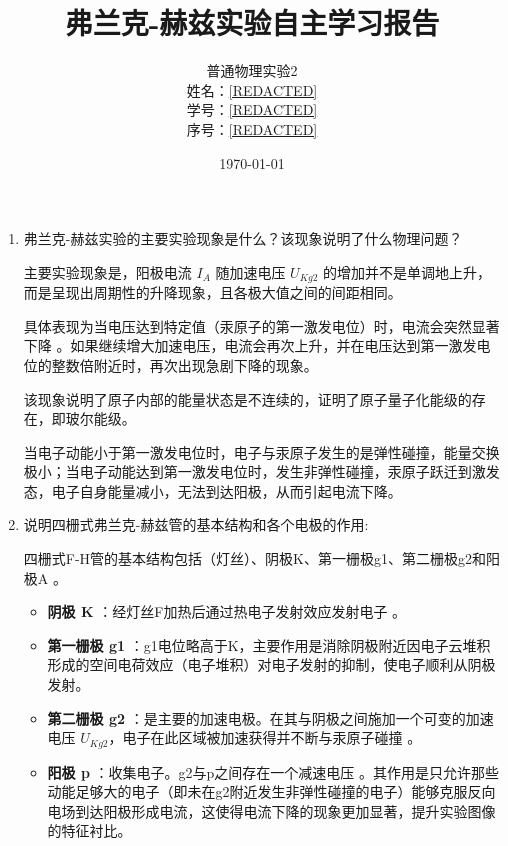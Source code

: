 \documentclass[12pt]{article}
\title{\Large\textbf {弗兰克-赫兹实验自主学习报告}}
\author{普通物理实验2\\
        姓名：\underline{\hspace{1cm}[REDACTED]\hspace{1cm}} \\
        学号：\underline{\hspace{0.5cm}[REDACTED]\hspace{0.5cm}} \\
        序号：\underline{\hspace{1.3cm}[REDACTED]\hspace{1.3cm}}}
\date{\today}
\newcommand{\question}[1]{{\CJKfamily{kaishu}#1}}
\begin{document}
\maketitle
\begin{enumerate}
    \item \question{弗兰克-赫兹实验的主要实验现象是什么？该现象说明了什么物理问题？}
    \par
    \hspace{1em}主要实验现象是，阳极电流 $I_A$ 随加速电压 $U_{Kg2}$ 的增加并不是单调地上升，而是呈现出周期性的升降现象，且各极大值之间的间距相同。
    \par
    \hspace{1em}具体表现为当电压达到特定值（汞原子的第一激发电位）时，电流会突然显著下降 。如果继续增大加速电压，电流会再次上升，并在电压达到第一激发电位的整数倍附近时，再次出现急剧下降的现象。\\
    \par
    \hspace{1em}该现象说明了原子内部的能量状态是不连续的，证明了原子量子化能级的存在，即玻尔能级。
    \par
    \hspace{1em}当电子动能小于第一激发电位时，电子与汞原子发生的是弹性碰撞，能量交换极小；当电子动能达到第一激发电位时，发生非弹性碰撞，汞原子跃迁到激发态，电子自身能量减小，无法到达阳极，从而引起电流下降。

    \item \question{说明四栅式弗兰克-赫兹管的基本结构和各个电极的作用:}
    \par
   \hspace{1em}四栅式F-H管的基本结构包括（灯丝）、阴极K、第一栅极g1、第二栅极g2和阳极A 。
    \begin{itemize}
        \item \textbf{阴极 K }：经灯丝F加热后通过热电子发射效应发射电子 。
        \item \textbf{第一栅极 g1 }：g1电位略高于K，主要作用是消除阴极附近因电子云堆积形成的空间电荷效应（电子堆积）对电子发射的抑制，使电子顺利从阴极发射。
        \item \textbf{第二栅极 g2 }：是主要的加速电极。在其与阴极之间施加一个可变的加速电压 $U_{Kg2}$，电子在此区域被加速获得并不断与汞原子碰撞 。
        \item \textbf{阳极 p }：收集电子。g2与p之间存在一个减速电压 。其作用是只允许那些动能足够大的电子（即未在g2附近发生非弹性碰撞的电子）能够克服反向电场到达阳极形成电流，这使得电流下降的现象更加显著，提升实验图像的特征衬比。
    \end{itemize}


\end{enumerate}
\end{document}
